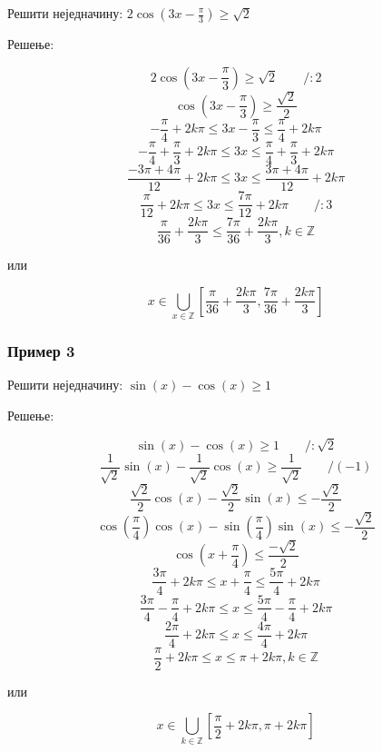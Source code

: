 \documentclass[../diplomski.tex]{subfiles}
\begin{document}
Решити неједначину: $2\cos(3x-\frac{\pi}{3})\ge\sqrt{2}$

Решење:



\[2\cos\left(3x-\frac{\pi}{3}\right)\geq\sqrt{2}\qquad/:2\]
\[\cos\left(3x-\frac{\pi}{3}\right)\geqslant\frac{\sqrt{2}}{2}\]
\[-\frac{\pi}{4}+2k\pi\leq3x-\frac{\pi}{3}\leq\frac{\pi}{4}+2k\pi\]
\[-\frac{\pi}{4}+\frac{\pi}{3}+2k\pi\leq3x\leq\frac{\pi}{4}+\frac{\pi}{3}+2k\pi\]
\[\frac{-3\pi+4\pi}{12}+2k\pi\leq3x\leq\frac{3\pi+4\pi}{12}+2k\pi\]
\[\frac{\pi}{12}+2k\pi\leq3x\leq\frac{7\pi}{12}+2k\pi\qquad/:3\]
\[\frac{\pi}{36}+\frac{2k\pi}{3}\leqslant\frac{7\pi}{36}+\frac{2k\pi}{3},k\in\mathbb{Z}\]
\centerline{или}
\[x\in\bigcup_{x\in\mathbb{Z}}\left[\frac{\pi}{36}+\frac{2k\pi}{3},\frac{7\pi}{36}+\frac{2k\pi}{3}\right]\]

\subsubsection{Пример 3}

Решити неједначину: $\sin(x)-\cos(x)\ge1$

Решење:



\[\sin(x)-\cos(x)\geqslant1\qquad/:\sqrt{2}\]
\[\frac{1}{\sqrt{2}}\sin(x)-\frac{1}{\sqrt{2}}\cos(x)\geqslant\frac{1}{\sqrt{2}}\qquad/(-1)\]
\[\frac{\sqrt{2}}{2}\cos(x)-\frac{\sqrt{2}}{2}\sin(x)\leq-\frac{\sqrt{2}}{2}\]
\[\cos\left(\frac{\pi}{4}\right)\cos(x)-\sin\left(\frac{\pi}{4}\right)\sin(x)\leqslant-\frac{\sqrt{2}}{2}\]
\[\cos\left(x+\frac{\pi}{4}\right)\leq\frac{-\sqrt{2}}{2}\]
\[\frac{3\pi}{4}+2k\pi\leqslant x+\frac{\pi}{4}\leqslant\frac{5\pi}{4}+2k\pi\]
\[\frac{3\pi}{4}-\frac{\pi}{4}+2k\pi\leqslant x\leqslant\frac{5\pi}{4}-\frac{\pi}{4}+2k\pi\]
\[\frac{2\pi}{4}+2k\pi\leqslant x\leqslant\frac{4\pi}{4}+2k\pi\]
\[\frac{\pi}{2}+2k\pi\leqslant x\leqslant\pi+2k\pi,k\in\mathbb{Z}\]
\centerline{или}
\[x\in\bigcup_{k\in\mathbb{Z}}\left[\frac{\pi}{2}+2k\pi,\pi+2k\pi\right]\]
\end{document}
